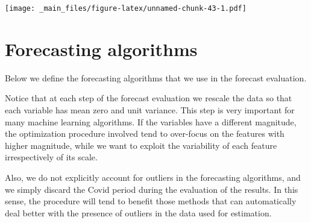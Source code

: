 \documentclass[
]{book}
\begin{document}
\texttt{[image: \_main\_files/figure-latex/unnamed-chunk-43-1.pdf]}

\hypertarget{forecasting-algorithms}{%
\section{Forecasting algorithms}\label{forecasting-algorithms}}

Below we define the forecasting algorithms that we use in the forecast evaluation.

Notice that at each step of the forecast evaluation we rescale the data so that each variable has mean zero and unit variance. This step is very important for many machine learning algorithms. If the variables have a different magnitude, the optimization procedure involved tend to over-focus on the features with higher magnitude, while we want to exploit the variability of each feature irrespectively of its scale.

Also, we do not explicitly account for outliers in the forecasting algorithms, and we simply discard the Covid period during the evaluation of the results. In this sense, the procedure will tend to benefit those methods that can automatically deal better with the presence of outliers in the data used for estimation.
\end{document}
